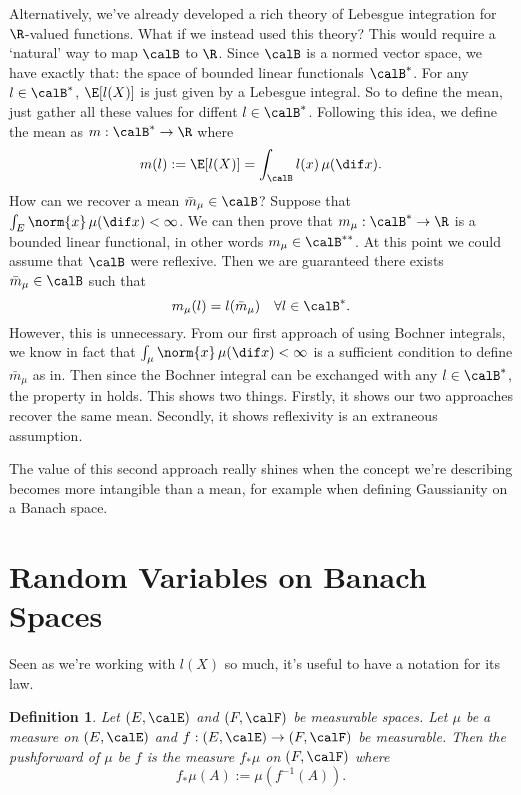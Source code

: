 \documentclass[fontsize=12pt, DIV=10]{scrreprt}
\theoremstyle{mydefn}
\newtheorem{defn}{Definition}
\theoremstyle{remark}
\newcommand{\defeq}{:=}
\begin{document}
Alternatively, we've already developed a rich theory of Lebesgue integration for $\R$-valued functions. What if we instead used this theory? This would require a `natural' way to map $\calB$ to $\R$. Since $\calB$ is a normed vector space, we have exactly that: the space of bounded linear functionals $\calB^*$. For any $l \in \calB^*$, $\E[l(X)]$ is just given by a Lebesgue integral. So to define the mean, just gather all these values for diffent $l \in \calB^*$. Following this idea, we define the mean as $m: \calB^* \to \R$ where
\begin{equation}
	m(l) \defeq \E[l(X)] = \int_{\calB} l(x) \, \mu(\dif x).
\end{equation}
How can we recover a mean $\bar{m}_{\mu} \in \calB$? Suppose that $\int_E \norm{x} \, \mu(\dif x) < \infty$. We can then prove that $m_{\mu}: \calB^* \to \R$ is a bounded linear functional, in other words $m_{\mu} \in \calB^{**}$. At this point we could assume that $\calB$ were reflexive. Then we are guaranteed there exists $\bar{m}_{\mu} \in \calB$ such that
\begin{equation}
	m_{\mu}(l) = l(\bar{m}_{\mu}) \quad \forall l \in \calB^*.
\end{equation}
However, this is unnecessary. From our first approach of using Bochner integrals, we know in fact that $\int_{\mu} \norm{x} \, \mu(\dif x) < \infty$ is a sufficient condition to define $\bar{m}_{\mu}$ as in. Then since the Bochner integral can be exchanged with any $l \in \calB^*$, the property in holds. This shows two things. Firstly, it shows our two approaches recover the same mean. Secondly, it shows reflexivity is an extraneous assumption.

The value of this second approach really shines when the concept we're describing becomes more intangible than a mean, for example when defining Gaussianity on a Banach space.

\section{Random Variables on Banach Spaces}


Seen as we're working with $l(X)$ so much, it's useful to have a notation for its law.
\begin{defn}
	Let $(E, \calE)$ and $(F, \calF)$ be measurable spaces. Let $\mu$ be a measure on $(E, \calE)$ and $f: (E, \calE) \to (F, \calF)$ be measurable. Then the \emph{pushforward} of $\mu$ be $f$ is the measure $f_* \mu$ on $(F, \calF)$ where
	\begin{equation}
		f_* \mu(A) \defeq \mu(f^{-1}(A)).
	\end{equation}
\end{defn}
\end{document}
